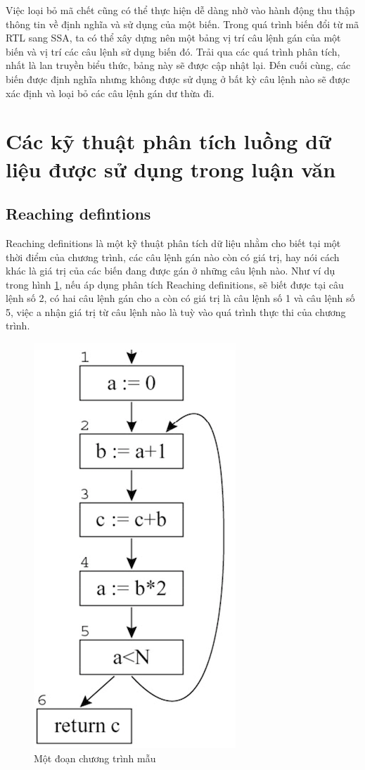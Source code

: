Việc loại bỏ mã chết cũng có thể thực hiện dễ dàng nhờ vào hành động thu thập thông tin về định nghĩa và sử dụng của một biến. Trong quá trình biến đổi từ mã RTL sang SSA, ta có thể xây dựng nên một bảng vị trí câu lệnh gán của một biến và vị trí các câu lệnh sử dụng biến đó. Trải qua các quá trình phân tích, nhất là lan truyền biểu thức, bảng này sẽ được cập nhật lại. Đến cuối cùng, các biến được định nghĩa nhưng không được sử dụng ở bất kỳ câu lệnh nào sẽ được xác định và loại bỏ các câu lệnh gán dư thừa đi.\\
\section{Các kỹ thuật phân tích luồng dữ liệu được sử dụng trong luận văn}
\subsection{Reaching defintions}
Reaching definitions \cite{reachingdef} là một kỹ thuật phân tích dữ liệu nhằm cho biết tại một thời điểm của chương trình, các câu lệnh gán nào còn có giá trị, hay nói cách khác là giá trị của các biến đang được gán ở những câu lệnh nào. Như ví dụ trong hình \ref{fig:reachingdefexam}, nếu áp dụng phân tích Reaching definitions, sẽ biết được tại câu lệnh số 2, có hai câu lệnh gán cho a còn có giá trị là câu lệnh số 1 và câu lệnh số 5, việc a nhận giá trị từ câu lệnh nào là tuỳ vào quá trình thực thi của chương trình.
\begin{figure}[h!]
	\centering
	\includegraphics[scale=0.75]{image/reachingDefExam}
	\caption{Một đoạn chương trình mẫu}
	\label{fig:reachingdefexam}
\end{figure}

